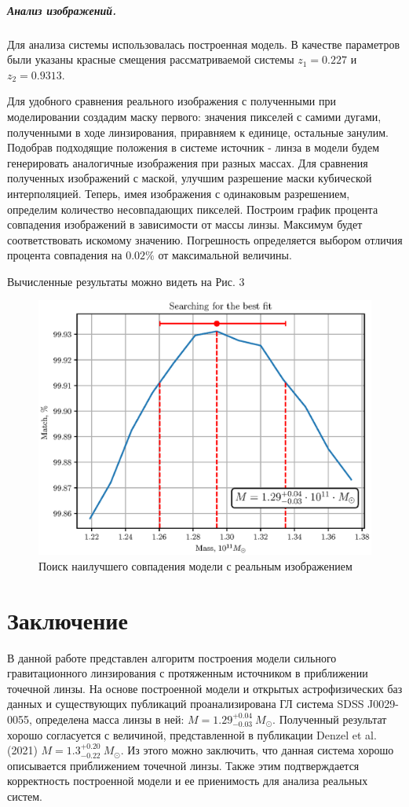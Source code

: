 \documentclass[12pt,a4paper]{article}
\begin{document}
\subparagraph*{Анализ изображений.}
Для анализа системы использовалась построенная модель. 
В качестве параметров были указаны красные смещения рассматриваемой системы $z_1 = 0.227$ и $z_2 = 0.9313$.

Для удобного сравнения реального изображения с полученными при моделировании создадим маску первого: значения пикселей с самими дугами, полученными в ходе линзирования, приравняем к единице, остальные занулим.
Подобрав подходящие положения в системе источник - линза в модели будем генерировать аналогичные изображения при разных массах. 
Для сравнения полученных изображений с маской, улучшим разрешение маски кубической интерполяцией. 
Теперь, имея изображения с одинаковым разрешением, определим количество несовпадающих пикселей. 
Построим график процента совпадения изображений в зависимости от массы линзы. 
Максимум будет соответствовать искомому значению. 
Погрешность определяется выбором отличия процента совпадения на $0.02\%$ от максимальной величины.

Вычисленные результаты можно видеть на Рис. 3
\begin{figure}[h]
    \centering
    \includegraphics[width=0.8\linewidth]{sources/resultMass.eps}
    \caption{\small Поиск наилучшего совпадения модели с реальным изображением}
\end{figure}

\section*{Заключение}
В данной работе представлен алгоритм построения модели сильного гравитационного линзирования с протяженным источником в приближении точечной линзы. 
На основе построенной модели и открытых астрофизических баз данных и существующих публикаций проанализирована ГЛ система SDSS J0029-0055, определена масса линзы в ней: $M = 1.29^{+0.04}_{-0.03}\ M_\odot$.
Полученный результат хорошо согласуется с величиной, представленной в публикации Denzel et al. (2021) $M = 1.3^{+0.20}_{-0.22}\ M_\odot$.
Из этого можно заключить, что данная система хорошо описывается приближением точечной линзы.
Также этим подтверждается корректность построенной модели и ее приенимость для анализа реальных систем.
\end{document}
